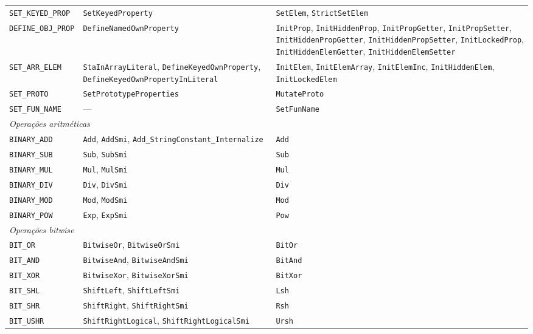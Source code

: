 {\begin{longtable}{@{}p{4.2cm}p{5.3cm}p{5.3cm}@{}}
\texttt{SET\_KEYED\_PROP} & \texttt{SetKeyedProperty} & \texttt{SetElem}, \texttt{StrictSetElem} \\
\texttt{DEFINE\_OBJ\_PROP} & \texttt{DefineNamedOwnProperty} & \texttt{InitProp}, \texttt{InitHiddenProp}, \texttt{InitPropGetter}, \texttt{InitPropSetter}, \texttt{InitHiddenPropGetter}, \texttt{InitHiddenPropSetter}, \texttt{InitLockedProp}, \texttt{InitHiddenElemGetter}, \texttt{InitHiddenElemSetter} \\
\texttt{SET\_ARR\_ELEM} & \texttt{StaInArrayLiteral}, \texttt{DefineKeyedOwnProperty}, \texttt{DefineKeyedOwnPropertyInLiteral} & \texttt{InitElem}, \texttt{InitElemArray}, \texttt{InitElemInc}, \texttt{InitHiddenElem}, \texttt{InitLockedElem} \\
\texttt{SET\_PROTO} & \texttt{SetPrototypeProperties} & \texttt{MutateProto} \\
\texttt{SET\_FUN\_NAME} & --- & \texttt{SetFunName} \\
\midrule
\multicolumn{3}{l}{\textit{Operações aritméticas}} \\
\midrule
\texttt{BINARY\_ADD} & \texttt{Add}, \texttt{AddSmi}, \texttt{Add\_StringConstant\_Internalize} & \texttt{Add} \\
\texttt{BINARY\_SUB} & \texttt{Sub}, \texttt{SubSmi} & \texttt{Sub} \\
\texttt{BINARY\_MUL} & \texttt{Mul}, \texttt{MulSmi} & \texttt{Mul} \\
\texttt{BINARY\_DIV} & \texttt{Div}, \texttt{DivSmi} & \texttt{Div} \\
\texttt{BINARY\_MOD} & \texttt{Mod}, \texttt{ModSmi} & \texttt{Mod} \\
\texttt{BINARY\_POW} & \texttt{Exp}, \texttt{ExpSmi} & \texttt{Pow} \\
\midrule
\multicolumn{3}{l}{\textit{Operações bitwise}} \\
\midrule
\texttt{BIT\_OR} & \texttt{BitwiseOr}, \texttt{BitwiseOrSmi} & \texttt{BitOr} \\
\texttt{BIT\_AND} & \texttt{BitwiseAnd}, \texttt{BitwiseAndSmi} & \texttt{BitAnd} \\
\texttt{BIT\_XOR} & \texttt{BitwiseXor}, \texttt{BitwiseXorSmi} & \texttt{BitXor} \\
\texttt{BIT\_SHL} & \texttt{ShiftLeft}, \texttt{ShiftLeftSmi} & \texttt{Lsh} \\
\texttt{BIT\_SHR} & \texttt{ShiftRight}, \texttt{ShiftRightSmi} & \texttt{Rsh} \\
\texttt{BIT\_USHR} & \texttt{ShiftRightLogical}, \texttt{ShiftRightLogicalSmi} & \texttt{Ursh} \\

\end{longtable}}
